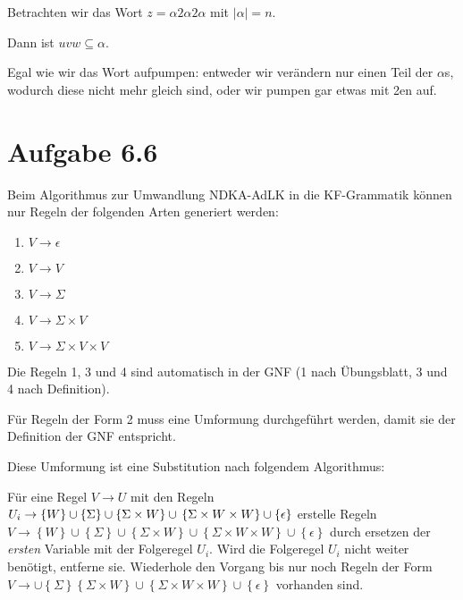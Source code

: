 \documentclass{article}
\begin{document}
Betrachten wir das Wort $z = \alpha 2 \alpha 2 \alpha$ mit $|\alpha|=n$.

Dann ist $uvw \subseteq \alpha$. 

Egal wie wir das Wort aufpumpen: entweder wir verändern nur einen Teil der $\alpha$s, wodurch diese nicht mehr gleich sind, oder wir pumpen gar etwas mit 2en auf.



\section*{Aufgabe 6.6}
Beim Algorithmus zur Umwandlung NDKA-AdLK in die KF-Grammatik können nur Regeln der folgenden Arten generiert werden:
\begin{enumerate}
	\item $V \rightarrow \epsilon$
  \item $V \rightarrow V$
  \item $V \rightarrow \Sigma$
  \item $V \rightarrow \Sigma \times V$
  \item $V \rightarrow \Sigma \times V \times V$
\end{enumerate}

Die Regeln 1, 3 und 4 sind automatisch in der GNF (1 nach Übungsblatt, 3 und 4 nach Definition).

Für Regeln der Form 2 muss eine Umformung durchgeführt werden, damit sie der Definition der GNF entspricht.

Diese Umformung ist eine Substitution nach folgendem Algorithmus:

Für eine Regel $V \rightarrow U$ mit den Regeln $U_i \rightarrow \left\{W\right\}\cup\left\{\Sigma\right\}\cup\left\{\Sigma\times W\right\}\cup\\\left\{\Sigma \times W \times W\right\}\cup\left\{\epsilon\right\}$ erstelle Regeln $V \rightarrow \left\{W\right\}\cup\left\{\Sigma\right\}\cup\left\{\Sigma\times W\right\}\cup\left\{\Sigma \times W \times W\right\}\cup\left\{\epsilon\right\}$ durch ersetzen der \textit{ersten} Variable mit der Folgeregel $U_i$. Wird die Folgeregel $U_i$ nicht weiter benötigt, entferne sie.
Wiederhole den Vorgang bis nur noch Regeln der Form $V \rightarrow \cup\left\{\Sigma\right\}\left\{\Sigma\times W\right\}\cup\left\{\Sigma \times W \times W\right\}\cup\left\{\epsilon\right\}$ vorhanden sind.
\end{document}
